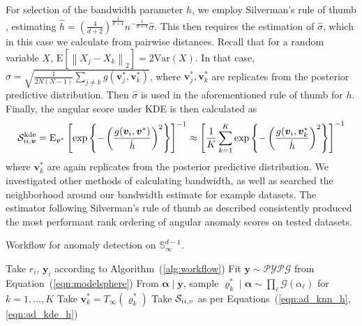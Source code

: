 For selection of the bandwidth parameter $h$, we employ Silverman's rule of
    thumb \citep{silverman2018}, estimating 
    $\hat{h} = \left(\frac{4}{d+2}\right)^{\frac{1}{d+4}}
        n^{-\frac{1}{d+4}}\hat{\sigma}$.
    This then requires the estimation of $\hat{\sigma}$, which in this case we
    calculate from pairwise distances.  Recall that for a random variable $X$,
    $\text{E}\left[\left\lVert X_j - X_k\right\rVert_2\right] 
        = 2\text{Var}(X)$.
    In that case, $\hat{\sigma} = 
        \sqrt{\frac{1}{2N(N-1)}\sum_{j\neq k}g(\bm{v}_j^*,\bm{v}_k^*)}$, where
    $\bm{v}_j^*,\bm{v}_k^*$ are replicates from the posterior predictive distribution.
    Then $\hat{\sigma}$ is used in the aforementioned rule of thumb for $h$.
    Finally, the angular score under KDE is then calculated as
    \begin{equation}
    \label{eqn:ad_kde_h}
    \mathcal{S}_{ii,\bm{v}}^{\text{kde}} = \text{E}_{\bm{v}^*}\left[\exp\left\lbrace -
    \left(\frac{g(\bm{v}_i,\bm{v}^*)}{\hat{h}}\right)^2\right\rbrace\right]^{-1}
    \approx
    \left[\frac{1}{K}\sum_{k = 1}^{K}
    \exp\left\lbrace-\left(\frac{g(\bm{v}_i,\bm{v}_k^*}{\hat{h}}\right)^2\right\rbrace\right]^{-1}
    \end{equation}
    where $\bm{v}_k^*$ are again replicates from the posterior predictive distribution.
    We investigated other methods of calculating bandwidth, as well as searched
    the neighborhood around our bandwidth estimate for example datasets.
    The estimator following Silverman's rule of thumb as described consistently 
    produced the most performant rank ordering of angular anomaly scores on 
    tested datasets.

\begin{algorithm}[htb]
    \caption{Workflow for anomaly detection on $\mathbb{S}_{\infty}^{d-1}$.}\label{alg:adreal}
    \begin{algorithmic}[1]
        \State Take $r_i$, $\bm{y}_i$ according to Algorithm~(\ref{alg:workflow})
        \State Fit $\bm{y}\sim\mathcal{PYPG}$ from Equation~(\ref{eqn:modelsphere})
        \State From $\bm{\alpha}\mid\bm{y}$, sample
            $\bm{\varrho}_k^{*}\mid\bm{\alpha}\sim\prod_{\ell}\mathcal{G}(\alpha_{\ell})$ for $k = 1,\ldots,K$
        \State Take $\bm{v}_k^{*} = T_{\infty}(\bm{\varrho}_k^{*})$
        \State Take $\mathcal{S}_{ii,v}$ as per Equations~(\ref{eqn:ad_knn_h},\ref{eqn:ad_kde_h})
    \end{algorithmic}
\end{algorithm}

